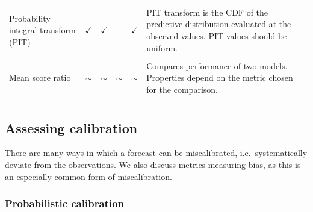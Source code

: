 \documentclass[
]{jss}
\begin{document}
\begin{CodeChunk}
\begin{longtable}[t]{>{\raggedright\arraybackslash}p{2.9cm}cccc>{\raggedright\arraybackslash}p{9.3cm}}
\addlinespace
Probability integral transform (PIT) & $\checkmark$ & $\checkmark$ & $-$ & $\checkmark$ & PIT transform is the CDF of the predictive distribution evaluated at the observed values. PIT values should be uniform.\\
\addlinespace
\cellcolor{gray!6}{Bias} & \cellcolor{gray!6}{$\checkmark$} & \cellcolor{gray!6}{$\checkmark$} & \cellcolor{gray!6}{$-$} & \cellcolor{gray!6}{$\checkmark$} & \cellcolor{gray!6}{Measure of relative tendency to over$-$ or under$-$predict (aspect of calibration), bounded between $-$1 and 1 (ideally 0)}\\
\addlinespace
Mean score ratio & $\sim$ & $\sim$ & $\sim$ & $\sim$ & Compares performance of two models. Properties depend on the metric chosen for the comparison.\\
\addlinespace
\cellcolor{gray!6}{(Scaled) Relative skill} & \cellcolor{gray!6}{$\sim$} & \cellcolor{gray!6}{$\sim$} & \cellcolor{gray!6}{$\sim$} & \cellcolor{gray!6}{$\sim$} & \cellcolor{gray!6}{Ranks models based on pairwise comparisons, useful in the context of missing forecasts. Properties depend on the metric chosen for the comparison.}\\
\bottomrule
\end{longtable}
\endgroup{}

\end{CodeChunk}

\newpage

\hypertarget{assessing-calibration}{%
\subsection{Assessing calibration}\label{assessing-calibration}}

There are many ways in which a forecast can be miscalibrated,
i.e.~systematically deviate from the observations. We also discuss
metrics measuring bias, as this is an especially common form of
miscalibration.

\hypertarget{probabilistic-calibration}{%
\subsubsection{Probabilistic
calibration}\label{probabilistic-calibration}}
\end{document}
